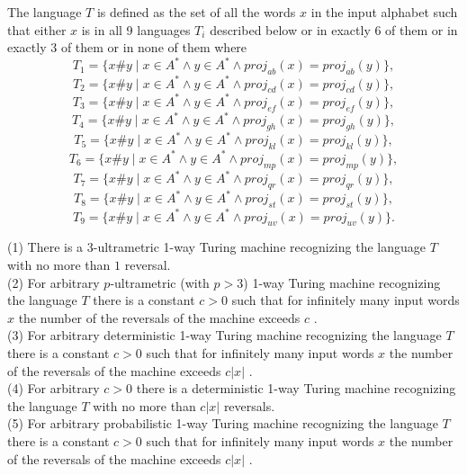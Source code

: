 \documentclass{llncs}
\begin{document}
The language $T$ is defined as the set of all the words $x$ in the input alphabet such that either $x$ is in all 9 languages $T_i$ described below or in exactly 6 of them or in exactly 3 of them or in none of them where
$$
T_1 = \{x\#y \mid x \in A^* \wedge y \in A^* \wedge proj_{ab}(x) = proj_{ab}(y)\},
$$
$$
T_2 = \{x\#y \mid x \in A^* \wedge y \in A^* \wedge proj_{cd}(x) = proj_{cd}(y)\},
$$
$$
T_3 = \{x\#y \mid x \in A^* \wedge y \in A^* \wedge proj_{ef}(x) = proj_{ef}(y)\},
$$
$$
T_4 = \{x\#y \mid x \in A^* \wedge y \in A^* \wedge proj_{gh}(x) = proj_{gh}(y)\},
$$
$$
T_5 = \{x\#y \mid x \in A^* \wedge y \in A^* \wedge proj_{kl}(x) = proj_{kl}(y)\},
$$
$$
T_6 = \{x\#y \mid x \in A^* \wedge y \in A^* \wedge proj_{mp}(x) = proj_{mp}(y)\},
$$
$$
T_7 = \{x\#y \mid x \in A^* \wedge y \in A^* \wedge proj_{qr}(x) = proj_{qr}(y)\},
$$
$$
T_8 = \{x\#y \mid x \in A^* \wedge y \in A^* \wedge proj_{st}(x) = proj_{st}(y)\},
$$
$$
T_9 = \{x\#y \mid x \in A^* \wedge y \in A^* \wedge proj_{uv}(x) = proj_{uv}(y)\}.
$$

\begin{theorem}
\label{pirma}
(1) There is a 3-ultrametric 1-way Turing machine recognizing the language $T$  with no more than $1$ reversal.\\
(2) For arbitrary $p$-ultrametric (with $ p > 3$) 1-way Turing machine recognizing the language $T$  there is a constant $c > 0$ such that for infinitely many input words $x$ the number of the reversals of the machine 
exceeds $c$ .\\
(3) For arbitrary deterministic 1-way Turing machine recognizing the language $T$  there is a constant $c > 0$ such that for infinitely many input words $x$ the number of the reversals of the machine 
exceeds $c |x|$ .\\
 (4) For  arbitrary $c > 0$  there is a deterministic 1-way Turing machine recognizing the language $T$  with no more than $c |x|$  reversals.\\
 (5) For arbitrary probabilistic 1-way Turing machine recognizing the language $T$  there is a constant $c > 0$ such that for infinitely many input words $x$ the number of the reversals of the machine 
exceeds $c |x|$ .\\
\end{theorem}
\end{document}
